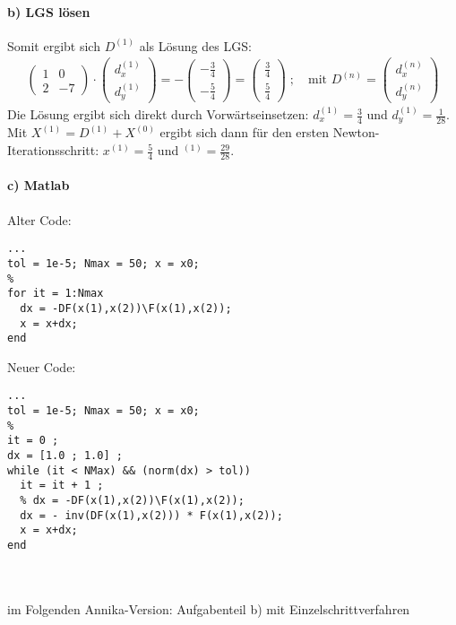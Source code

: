 \paragraph*{b) LGS lösen}
Somit ergibt sich $D^{(1)}$ als Lösung des LGS:
\begin{align*}
  \begin{pmatrix}1 & 0 \\ 2 & -7\end{pmatrix} \cdot
  \begin{pmatrix}d_x^{(1)} \\ d_y^{(1)}\end{pmatrix} =
  - \begin{pmatrix}-\frac{3}{4} \\ -\frac{5}{4}\end{pmatrix} =
  \begin{pmatrix}\frac{3}{4} \\ \frac{5}{4}\end{pmatrix} \; ; \quad
  \text{mit } D^{(n)} = \begin{pmatrix}d_x^{(n)} \\ d_y^{(n)}\end{pmatrix}
\end{align*}
Die Lösung ergibt sich direkt durch Vorwärtseinsetzen: $d_x^{(1)} = \frac{3}{4}$
und $d_y^{(1)} = \frac{1}{28}$. Mit $X^{(1)} = D^{(1)} + X^{(0)}$ ergibt sich dann
für den ersten Newton-Iterationsschritt:
$x^{(1)} = \frac{5}{4}$ und $^{(1)} = \frac{29}{28}$.

\paragraph*{c) Matlab}
Alter Code:
\begin{verbatim}
...
tol = 1e-5; Nmax = 50; x = x0;
%
for it = 1:Nmax
  dx = -DF(x(1),x(2))\F(x(1),x(2));
  x = x+dx;
end
\end{verbatim}
Neuer Code:
\begin{verbatim}
...
tol = 1e-5; Nmax = 50; x = x0;
%
it = 0 ;
dx = [1.0 ; 1.0] ;
while (it < NMax) && (norm(dx) > tol))
  it = it + 1 ;
  % dx = -DF(x(1),x(2))\F(x(1),x(2));
  dx = - inv(DF(x(1),x(2))) * F(x(1),x(2));
  x = x+dx;
end
\end{verbatim}\\\\
im Folgenden Annika-Version: Aufgabenteil b) mit Einzelschrittverfahren
